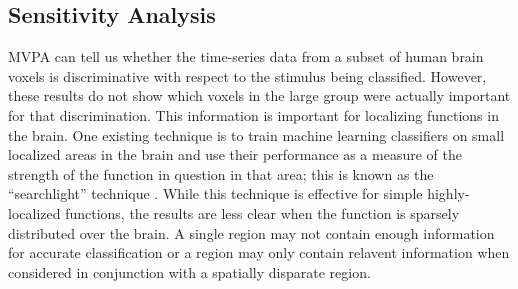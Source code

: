 \documentclass[preprint,5p,authoryear]{elsarticle}
\begin{document}
\subsection{Sensitivity Analysis}
MVPA can tell us whether the time-series data from a subset of human brain voxels is discriminative with respect to the stimulus being classified. 
However, these results do not show which voxels in the large group were actually important for that discrimination.
This information is important for localizing functions in the brain.
One existing technique is to train machine learning classifiers on small localized areas in the brain and use their performance as a measure of the strength of the function in question in that area; this is known as the ``searchlight'' technique \citep{Kriegeskorte2006}.
While this technique is effective for simple highly-localized functions, the results are less clear when the function is sparsely distributed over the brain.
A single region may not contain enough information for accurate classification or a region may only contain relavent information when considered in conjunction with a spatially disparate region.
\end{document}
